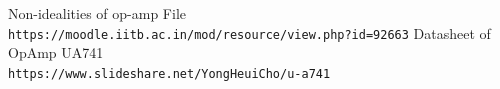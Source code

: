 \documentclass[12pt]{article}
\begin{document}
\vspace{4cm}

    \begin{thebibliography}{9}

        Non-idealities of op-amp File 
        \\\texttt{https://moodle.iitb.ac.in/mod/resource/view.php?id=92663}
        Datasheet of OpAmp UA741
        \\\texttt{https://www.slideshare.net/YongHeuiCho/u-a741}
        
    \end{thebibliography}
\end{document}

